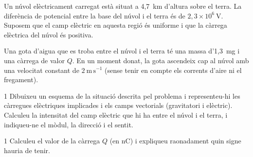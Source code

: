 Un núvol elèctricament carregat està situat a 4,7~km d'altura sobre el terra. La diferència de potencial entre la base del núvol i el terra és de $2,3\times 10^{6}\ \mathrm{V}$. Suposem que el camp elèctric en aquesta regió és uniforme i que la càrrega elèctrica del núvol és positiva.

Una gota d'aigua que es troba entre el núvol i el terra té una massa d'1,3~mg i una càrrega de valor $Q$. En un moment donat, la gota ascendeix cap al núvol amb una velocitat constant de $2\ \mathrm{m\,s^{-1}}$ (sense tenir en compte els corrents d'aire ni el fregament).

\begin{apartat}{1}
Dibuixeu un esquema de la situació descrita pel problema i representeu-hi les càrregues elèctriques implicades i els camps vectorials (gravitatori i elèctric). Calculeu la intensitat del camp elèctric que hi ha entre el núvol i el terra, i indiqueu-ne el mòdul, la direcció i el sentit.
\end{apartat}

\begin{apartat}{1}
Calculeu el valor de la càrrega $Q$ (en nC) i expliqueu raonadament quin signe hauria de tenir.
\end{apartat}


